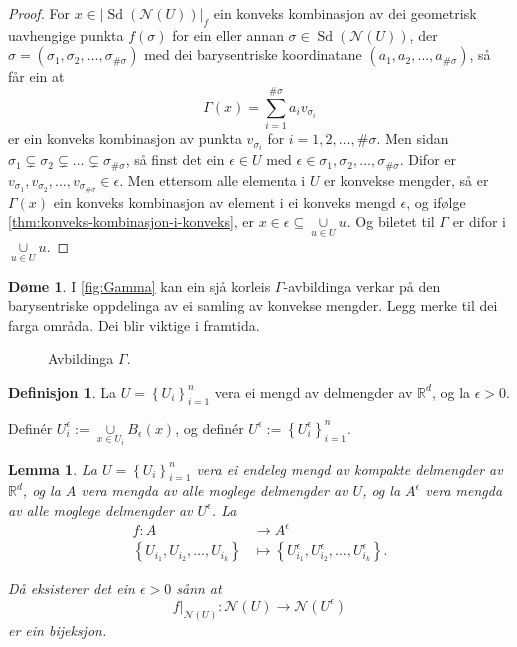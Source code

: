 \documentclass[a4paper, 12pt, norsk]{article}
\theoremstyle{plain}
\newtheorem{lemma}[theorem]{Lemma}
\theoremstyle{definition}
\newtheorem{definition}[theorem]{Definisjon}
\newtheorem{example}[theorem]{Døme}
\newcommand{\Rb}{\mathbb{R}}
\newcommand{\Nc}{\mathcal{N}}
\newcommand{\union}{ \mathop{\cup}\limits }
\newcommand{\gr}[1]{ \lvert #1 \rvert } %
\newcommand{\set}[1]{ \left\{ #1 \right\} } %
\newcommand{\tuple}[1]{ \left( #1 \right) } %
\DeclareMathOperator{\Sd}{Sd} %
\begin{document}
\begin{proof}
	For \( x \in \gr{\Sd(\Nc(U))}_f \) ein konveks kombinasjon av dei geometrisk uavhengige punkta \( f(\sigma) \) for ein eller annan \( \sigma \in \Sd(\Nc(U)) \), der \( \sigma = \tuple{\sigma_1, \sigma_2, \dots, \sigma_{\#\sigma}} \) med dei barysentriske koordinatane \( \tuple{a_1, a_2, \dots, a_{\#\sigma}} \), så får ein at
	\[
		\Gamma(x) = \sum_{i=1}^{\#\sigma} a_i v_{\sigma_i}
	\]
	er ein konveks kombinasjon av punkta \( v_{\sigma_i} \) for \( i = 1,2,\dots,\#\sigma \). Men sidan \( \sigma_1 \subsetneq \sigma_2 \subsetneq \dots \subsetneq \sigma_{\#\sigma} \), så finst det ein \( \epsilon \in U \) med \( \epsilon \in \sigma_1, \sigma_2, \dots, \sigma_{\#\sigma} \). Difor er \( v_{\sigma_1}, v_{\sigma_2}, \dots, v_{\sigma_{\#\sigma}} \in \epsilon \). Men ettersom alle elementa i \( U \) er konvekse mengder, så er \( \Gamma(x) \) ein konveks kombinasjon av element i ei konveks mengd \( \epsilon \), og ifølge \autoref{thm:konveks-kombinasjon-i-konveks}, er \( x \in \epsilon \subseteq \union_{u\in U} u \). Og biletet til \( \Gamma \) er difor i \( \union_{u\in U} u \).
\end{proof}

\begin{example}
	I \autoref{fig:Gamma} kan ein sjå korleis \( \Gamma \)-avbildinga verkar på den barysentriske oppdelinga av ei samling av konvekse mengder. Legg merke til dei farga områda. Dei blir viktige i framtida.
	\begin{figure}[htbp]
		\begin{center}
			
		\end{center}
		\caption{Avbildinga \( \Gamma \).}
		\label{fig:Gamma}
	\end{figure}
\end{example}

\begin{definition}
	La \(  U=\set{U_i}_{i=1}^n \) vera ei mengd av delmengder av \( \Rb^d \), og la \( \epsilon > 0 \).
	
	Definér \( U_i^\epsilon := \union_{x \in U_i} B_\epsilon(x) \), og definér \( U^\epsilon := \set{U_i^\epsilon}_{i=1}^n \).
\end{definition}

\begin{lemma} \label{thm:epsilondekke}
	La \( U = \set{U_i}_{i=1}^n \) vera ei endeleg mengd av kompakte delmengder av \( \Rb^d \), og la \( A \) vera mengda av alle moglege delmengder av \( U \), og la \( A^\epsilon \) vera mengda av alle moglege delmengder av \( U^\epsilon \). La
	\begin{align*}
		f: A &\to A^\epsilon \\
		\set{U_{i_1}, U_{i_2}, \dots, U_{i_k}} &\mapsto \set{U_{i_1}^\epsilon, U_{i_2}^\epsilon, \dots, U_{i_k}^\epsilon}.
	\end{align*}
	
	Då eksisterer det ein \( \epsilon > 0 \) sånn at
	\[
		f|_{\Nc(U)}: \Nc(U) \to \Nc(U^\epsilon)
	\]
	er ein bijeksjon.
\end{lemma}
\end{document}

